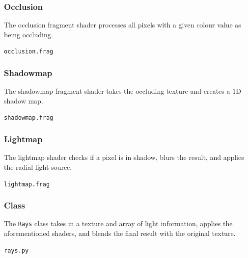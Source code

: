 \documentclass[../main/main.tex]{subfiles}
\begin{document}
\subsubsection*{Occlusion}
The occlusion fragment shader processes all pixels with a given colour value as being occluding.

\noindent\verb|occlusion.frag|


\subsubsection*{Shadowmap}
The shadowmap fragment shader takes the occluding texture and creates a 1D shadow map.

\noindent\verb|shadowmap.frag|


\subsubsection*{Lightmap}
The lightmap shader checks if a pixel is in shadow, blurs the result, and applies the radial light source.

\noindent\verb|lightmap.frag|


\subsubsection*{Class}
The \lstinline{Rays} class takes in a texture and array of light information, applies the aforementioned shaders, and blends the final result with the original texture.

\noindent\verb|rays.py|

\end{document}

